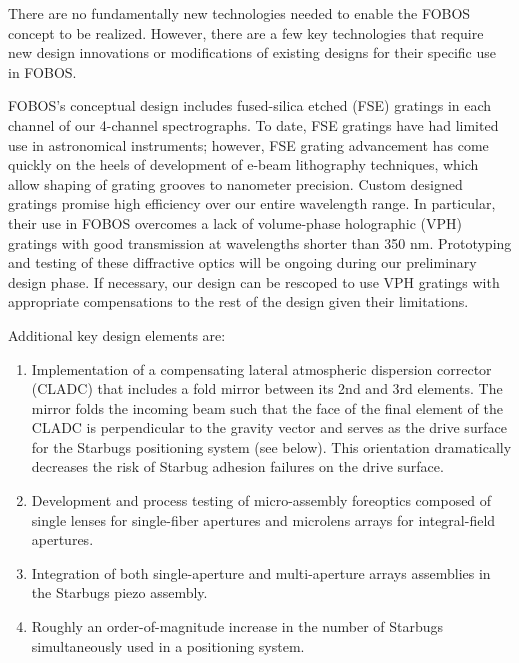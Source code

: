 \documentclass[oneside,11pt]{amsart}
\begin{document}

There are no fundamentally new technologies needed to enable the
FOBOS concept to be realized. However, there are a few key
technologies that require new design innovations or modifications of
existing designs for their specific use in FOBOS.



FOBOS's conceptual design includes fused-silica etched (FSE) gratings
in each channel of our 4-channel spectrographs. To date, FSE gratings
have had limited use in astronomical instruments; however, FSE
grating advancement has come quickly on the heels of development of
e-beam lithography techniques, which allow shaping of grating grooves
to nanometer precision. Custom designed gratings promise high
efficiency over our entire wavelength range. In particular, their use
in FOBOS overcomes a lack of volume-phase holographic (VPH) gratings
with good transmission at wavelengths shorter than 350 nm.
Prototyping and testing of these diffractive optics will be ongoing
during our preliminary design phase. If necessary, our design can be
rescoped to use VPH gratings with appropriate compensations to the
rest of the design given their limitations.

Additional key design elements are:
%
\begin{enumerate}
\item Implementation of a compensating lateral atmospheric dispersion
corrector (CLADC) that includes a fold mirror between its 2nd and 3rd
elements. The mirror folds the incoming beam such that the face of
the final element of the CLADC is perpendicular to the gravity vector
and serves as the drive surface for the Starbugs positioning system
(see below). This orientation dramatically decreases the risk of
Starbug adhesion failures on the drive surface.
\item Development and process testing of micro-assembly foreoptics
composed of single lenses for single-fiber apertures and microlens
arrays for integral-field apertures.
\item Integration of both single-aperture and multi-aperture arrays
assemblies in the Starbugs piezo assembly.
\item Roughly an order-of-magnitude increase in the number of Starbugs
simultaneously used in a positioning system.
\end{enumerate}
\end{document}
